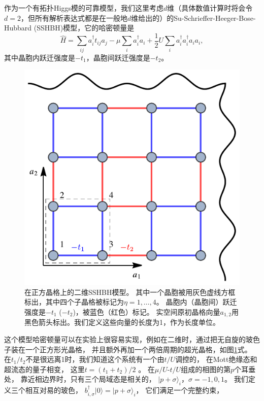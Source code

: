 作为一个有拓扑Higgs模的可靠模型，我们这里考虑$d$维（具体数值计算时将会令$d=2$，但所有解析表达式都是在一般地$d$维给出的）的Su-Schrieffer-Heeger-Bose-Hubbard (SSHBH)模型，它的哈密顿量是
\begin{equation}
  \hat{H} = \sum_{i   j} a_i^{ \dagger} t_{i   j} a_j - \mu \sum_i
  a_i^{ \dagger} a_i + \frac{1}{2}U \sum_i a^{ \dagger}_i a_i^{ \dagger} a_i a_i, \label{h}
\end{equation}
其中晶胞内跃迁强度是$- t_1$，晶胞间跃迁强度是$- t_2$。%
\begin{figure}[t]
\centering
    \includegraphics[width=.8\textwidth]{figures/FigLattice.pdf}
    \caption{在正方晶格上的二维SSHBH模型。
    其中一个晶胞被用灰色虚线方框标出，其中四个子晶格被标记为$\eta=1,\dots,4$。
    晶胞内（晶胞间）跃迁强度是$-t_1$ ($-t_2$)，被蓝色（红色）标记。
    实空间原初晶格向量$a_{1,2}$用黑色箭头标出。我们定义这些向量的长度为1，作为长度单位。}
    \label{lattice}
\end{figure}
这个模型哈密顿量可以在实验上很容易实现，例如在二维时，通过把无自旋的玻色子装在一个正方形光晶格，
并且额外再加一个两倍周期的超光晶格，如图\ref{lattice}式。
在$t_1 / t_2$不是很远离1时，我们知道这个系统有一个由$t / U$调控的，
在Mott绝缘态和超流态的量子相变，
这里$t = (t_1 + t_2)/2$ \cite{Fisher1989}。
在$\mu/U$-$t/U$组成的相图的第$p$个耳垂处，
靠近相边界时，只有三个局域态是相关的，
$| p + \sigma \rangle_i$，$\sigma = - 1, 0, 1$。
我们定义三个相互对易的玻色，
$b_{i, \sigma}^{ \dagger} | 0 \rangle = | p + \sigma \rangle_i$，
它们满足一个完整约束，
